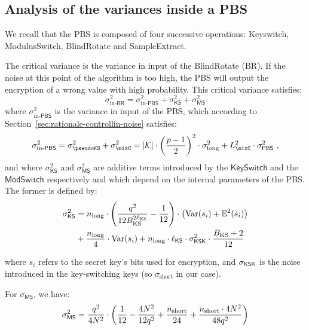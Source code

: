 \subsection{Analysis of the variances inside a PBS}
\label{sec:pbs_variance_analysis}

We recall that the PBS is composed of four successive operations: \textsf{Keyswitch}, \textsf{ModulusSwitch}, \textsf{BlindRotate} and \textsf{SampleExtract}.


The critical variance is the variance in input of the \textsf{BlindRotate} (\textsf{BR}). If the noise at this point of the algorithm is too high, the PBS will output the encryption of a wrong value with high probability. This critical variance satisfies:
$$\sigma^2_{\text{in-}\textsf{BR}} = \sigma^2_{\text{in-}\textsf{PBS}} + \sigma^2_{\textsf{KS}} + \sigma^2_{\textsf{MS}}$$
where $\sigma^2_{\text{in-}\textsf{PBS}}$ is the variance in input of the PBS, which according to Section~\ref{sec:rationale-controllin-noise} satisfies:
$$\sigma^2_{\text{in-}\textsf{PBS}} = \sigma_\pseudoKS^2+\sigma^2_\mixC = 
|\mathcal{K}| \cdot \left(\frac{p-1}2\right)^2 \cdot \sigma_{\text{long}}^2 + L_\mixC^2 \cdot \sigma^2_{\textsf{PBS}}~,$$
and where $\sigma^2_{\textsf{KS}}$ and $\sigma^2_{\textsf{MS}}$ are additive terms introduced by the $\textsf{KeySwitch}$ and the $\textsf{ModSwitch}$ respectively and which depend on the internal parameters of the PBS. The former is defined by:
%
\begin{equation*}
	\begin{aligned}
		\sigma_{\sf{KS}}^2 & = n_{\text{long}} \cdot \left( \frac{q^2}{12B_{\text{KS}}^{2\ell_{\text{KS}}}} - \frac{1}{12} \right) \cdot \left( \text{Var}(s_i) + \mathbb{E}^2(s_i) \right) \\
		& + \frac{n_{\text{long}}}{4} \cdot \text{Var}(s_i) + n_{\text{long}} \cdot \ell_{\sf{KS}} \cdot \sigma_{\sf{KSK}}^2 \cdot \frac{B_{\text{KS}} + 2}{12}
	\end{aligned}
\end{equation*}

where $s_i$ refers to the secret key's bits used for encryption, and $\sigma_{\sf{KSK}}$ is the noise introduced in the key-switching keys (so $\sigma_{\text{short}}$ in our case).

For $\sigma_{\textsf{MS}}$, we have:
\begin{equation*}
	\sigma^2_{\sf{MS}} = \frac {q^2} {4 N^2} \cdot \left ( \frac{1}{12} - \frac{4N^2}{12 q^2} + \frac{n_{\text{short}}}{24} + \frac{n_{\text{short}} \cdot 4 N^2}{48 q^2} \right )
\end{equation*}

